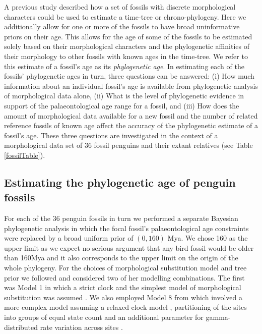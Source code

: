 \documentclass[11pt]{article}
\begin{document}
A previous study described how a set of fossils with discrete morphological characters could be used to estimate a time-tree or chrono-phylogeny. Here we additionally allow for one or more of the fossils to have broad uninformative priors on their age. This allows for the age of some of the fossils to be estimated solely based on their morphological characters and the phylogenetic affinities of their morphology to other fossils with known ages in the time-tree. We refer to this estimate of a fossil's age as its {\em phylogenetic age}. In estimating each of the fossils' phylogenetic ages in turn, three questions can be answered: (i) How much information about an individual fossil's age is available from phylogenetic analysis of morphological data alone, (ii) What is the level of phylogenetic evidence in support of the palaeontological age range for a fossil, and (iii) How does the amount of morphological data available for a new fossil and the number of related reference fossils of known age affect the accuracy of the phylogenetic estimate of a fossil's age. These three questions are investigated in the context of a morphological data set of 36 fossil penguins and their extant relatives \autocite{gavryushkina2015bayesian} (see Table \ref{fossilTable}).

\subsection*{Estimating the phylogenetic age of penguin fossils}

For each of the 36 penguin fossils in turn we performed a separate Bayesian phylogenetic analysis in which the focal fossil's palaeontological age constraints were replaced by a broad uniform prior of $(0,160)$ Mya. We chose 160 as the upper limit as we expect no serious argument that any bird fossil would be older than 160Mya and it also corresponds to the upper limit on the origin of the whole phylogeny. For the choices of morphological substitution model and tree prior we followed \textcite{gavryushkina2015bayesian} and considered two of her modelling combinations. The first was Model 1 in which a strict clock and the simplest model of morphological substitution was assumed \autocite{Lewis2001}. We also employed Model 8 from \textcite{gavryushkina2015bayesian} which involved a more complex model assuming a relaxed clock model \autocite{Drummond2006}, partitioning of the sites into groups of equal state count and an additional parameter for gamma-distributed rate variation across sites \autocite{yang:1994ma}.
\end{document}
